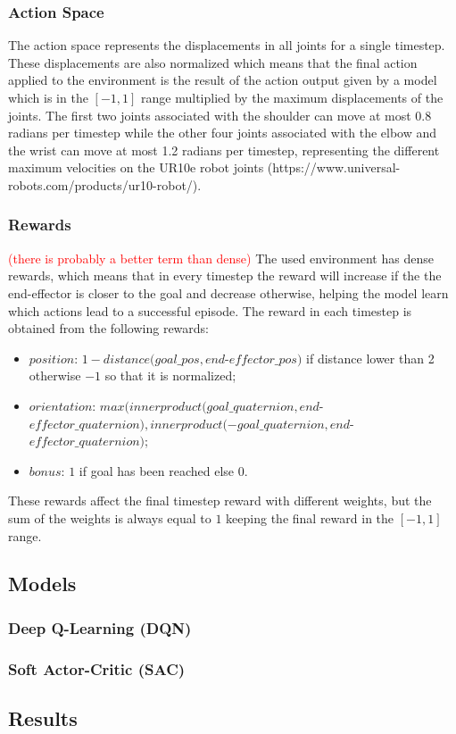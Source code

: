 \subsubsection{Action Space}

The action space represents the displacements in all joints for a single timestep. These displacements are also normalized which means that the final action applied to the environment is the result of the action output given by a model which is in the $[-1, 1]$ range multiplied by the maximum displacements of the joints. The first two joints associated with the shoulder can move at most 0.8 radians per timestep while the other four joints associated with the elbow and the wrist can move at most 1.2 radians per timestep, representing the different maximum velocities on the UR10e robot joints (https://www.universal-robots.com/products/ur10-robot/).

\subsubsection{Rewards}

\textcolor{red}{(there is probably a better term than dense)}
The used environment has dense rewards, which means that in every timestep the reward will increase if the the end-effector is closer to the goal and decrease otherwise, helping the model learn which actions lead to a successful episode. The reward in each timestep is obtained from the following rewards:

\begin{itemize}
    \item $position$: $1-distance(goal\_pos, end$-$effector\_pos)$ if distance lower than 2 otherwise $-1$ so that it is normalized;
    \item $orientation$: $max(innerproduct(goal\_quaternion, end$-$effector\_quaternion), innerproduct(-goal\_quaternion, end$-$effector\_quaternion)$;
    \item $bonus$: $1$ if goal has been reached else $0$.
\end{itemize}

These rewards affect the final timestep reward with different weights, but the sum of the weights is always equal to $1$ keeping the final reward in the $[-1, 1]$ range.

\subsection{Models}

\subsubsection{Deep Q-Learning (DQN)}

\subsubsection{Soft Actor-Critic (SAC)}

\subsection{Results}
